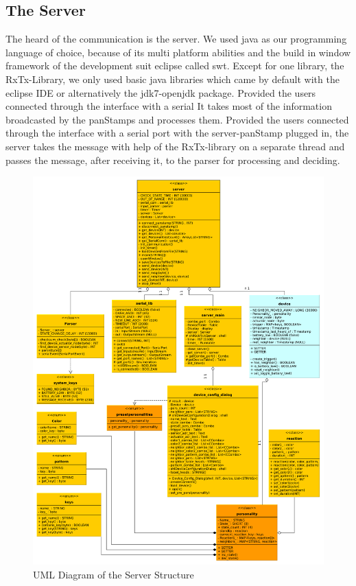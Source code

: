 \subsection{The Server}
The heard of the communication is the server. We used java\cite{java} as our programming language of choice, because of its multi platform abilities and the build in window framework of the development suit eclipse\cite{eclipse} called swt\cite{swt}. Except for one library, the RxTx-Library\cite{rxtx}, we only used basic java libraries which came by default with the eclipse IDE\cite{ide}  or alternatively the jdk7-openjdk\cite{open_jdk} package.
Provided the users connected through the interface with a serial It takes most of the information broadcasted by the panStamps\cite{panstamp} and processes them.
Provided the users connected through the interface with a serial port with the server-panStamp plugged in, the server takes the message with help of the RxTx-library\cite{rxtx} on a separate thread and passes the message, after receiving it, to the parser for processing and deciding.

\begin{figure}[ht]
	\centerline{\includegraphics[width=\textwidth]{./graph/general.pdf}}
	\caption{UML Diagram of the Server Structure}
	\label{fig:server_uml}
\end{figure}
